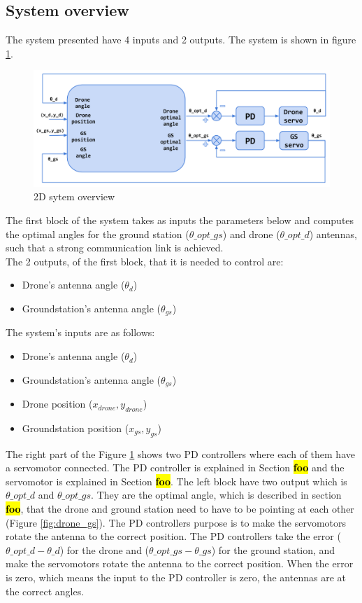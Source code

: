 \subsection{System overview}
The system presented have 4 inputs and 2 outputs. The system is shown in figure \ref{fig:2d_system}. 

\begin{figure}[h]
	\centering
	\includegraphics[scale=0.42]{figures/2d_system.png}
	\caption{2D sytem overview}
	\label{fig:2d_system}
\end{figure}
The first block of the system takes as inputs the parameters below and computes the optimal angles for the ground station ($\theta\_opt\_gs$) and drone ($\theta\_opt\_d$) antennas, such that a strong communication link is achieved. \\

\noindent The 2 outputs, of the first block, that it is needed to control are:
\begin{itemize}
	\item Drone's antenna angle ($\theta_{d}$)
	\item Groundstation's antenna angle ($\theta_{gs}$)
\end{itemize}

\noindent The system's inputs are as follows:
\begin{itemize}
	\item Drone's antenna angle ($\theta_{d}$)
	\item Groundstation's antenna angle ($\theta_{gs}$)
	\item Drone position ($x_{drone},y_{drone}$)
	\item Groundstation position ($x_{gs},y_{gs}$)
\end{itemize}   

The right part of the Figure \ref{fig:2d_system} shows two PD controllers where each of them have a servomotor connected. The PD controller is explained in Section \hl{\textbf{foo}}  and the servomotor is explained in Section \hl{\textbf{foo}}. The left block have two output which is $\theta\_opt\_d$ and $\theta\_opt\_gs$. They are the optimal angle, which is described in section \hl{\textbf{foo}}, that the drone and ground station need to have to be pointing at each other (Figure \ref{fig:drone_gs}). The PD controllers purpose is to make the servomotors rotate the antenna to the correct position. The PD controllers take the error ($\theta\_opt\_d - \theta\_d$) for the drone and ($\theta\_opt\_gs - \theta\_gs$) for the ground station, and make the servomotors rotate the antenna to the correct position. When the error is zero, which means the input to the PD controller is zero, the antennas are at the correct angles.

